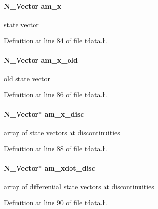 \paragraph[{am\+\_\+x}]{\setlength{\rightskip}{0pt plus 5cm}N\+\_\+\+Vector am\+\_\+x}\label{struct_temp_data_a4527d9abde45ba3982c35d2c12969d36}
state vector 

Definition at line 84 of file tdata.\+h.

\hypertarget{struct_temp_data_ab2b23f4045b47a4a73226543e77f9dcc}{}
\paragraph[{am\+\_\+x\+\_\+old}]{\setlength{\rightskip}{0pt plus 5cm}N\+\_\+\+Vector am\+\_\+x\+\_\+old}\label{struct_temp_data_ab2b23f4045b47a4a73226543e77f9dcc}
old state vector 

Definition at line 86 of file tdata.\+h.

\hypertarget{struct_temp_data_aded6511f60d9b0cdfe5f4df047d8a5dd}{}
\paragraph[{am\+\_\+x\+\_\+disc}]{\setlength{\rightskip}{0pt plus 5cm}N\+\_\+\+Vector$\ast$ am\+\_\+x\+\_\+disc}\label{struct_temp_data_aded6511f60d9b0cdfe5f4df047d8a5dd}
array of state vectors at discontinuities 

Definition at line 88 of file tdata.\+h.

\hypertarget{struct_temp_data_ab3837be5f66a858b04b2e6fbae66a100}{}
\paragraph[{am\+\_\+xdot\+\_\+disc}]{\setlength{\rightskip}{0pt plus 5cm}N\+\_\+\+Vector$\ast$ am\+\_\+xdot\+\_\+disc}\label{struct_temp_data_ab3837be5f66a858b04b2e6fbae66a100}
array of differential state vectors at discontinuities 

Definition at line 90 of file tdata.\+h.

\hypertarget{struct_temp_data_aae23888e89a7bd3c65a22784acaa1328}{}
